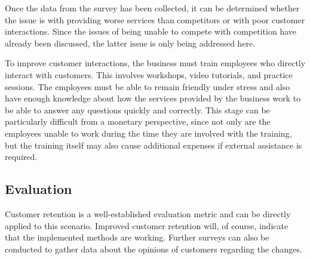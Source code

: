 \documentclass{article}
\begin{document}
Once the data from the survey has been collected, it can be determined whether the issue is with providing worse services than competitors or with poor customer interactions. Since the issues of being unable to compete with competition have already been discussed, the latter issue is only being addressed here.

To improve customer interactions, the business must train employees who directly interact with customers. This involves workshops, video tutorials, and practice sessions. The employees must be able to remain friendly under stress and also have enough knowledge about how the services provided by the business work to be able to answer any questions quickly and correctly. This stage can be particularly difficult from a monetary perspective, since not only are the employees unable to work during the time they are involved with the training, but the training itself may also cause additional expenses if external assistance is required.

\subsection{Evaluation}
Customer retention is a well-established evaluation metric and can be directly applied to this scenario. Improved customer retention will, of course, indicate that the implemented methods are working. Further surveys can also be conducted to gather data about the opinions of customers regarding the changes.
\end{document}
